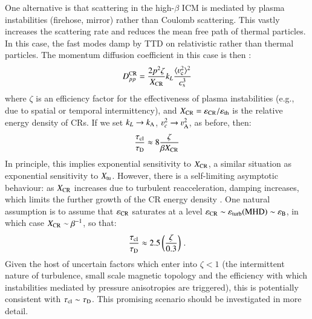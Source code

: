 \documentclass[fleqn,usenatbib,useAMS]{mnras}
\newcommand{\eps}{\varepsilon}
\begin{document}
One alternative is that scattering in the high-$\beta$ ICM is mediated by plasma instabilities (firehose, mirror) rather than Coulomb scattering. This vastly increases the scattering rate and reduces the mean free path of thermal particles. In this case, the fast modes damp by TTD on relativistic rather than thermal particles. The momentum diffusion coefficient in this case is then \citep{brunetti11, miniati15}:
\begin{equation}
D_{pp}^{\rm CR} = \frac{2 p^{2} \zeta}{X_{\rm CR}} k_L \frac{\langle \varv_{\rm c}^{2} \rangle^{2}}{c_{\rm s}^{3}}
\end{equation}
where $\zeta$ is an efficiency factor for the effectiveness of plasma instabilities (e.g., due to spatial or temporal intermittency), and $X_{\rm CR}=\eps_{\rm CR}/\eps_{\rm th}$ is the relative energy density of CRs. If we set $k_L \rightarrow k_{\rm A}$, $\varv_{c}^{2} \rightarrow \varv_{\rm A}^{2}$, as before, then: 
\begin{equation}
\frac{\tau_{\rm cl}}{\tau_{\rm D}} \approx 8 \frac{\zeta}{\beta X_{\rm CR}}
\end{equation}
In principle, this implies exponential sensitivity to $X_{\rm CR}$, a similar situation as exponential sensitivity to $X_{\rm tu}$. However, there is a self-limiting asymptotic behaviour: as $X_{\rm CR}$ increases due to turbulent reacceleration, damping increases, which limits the further growth of the CR energy density \citep{brunetti11}. One natural assumption is to assume that $\eps_{\rm CR}$ saturates at a level $\eps_{\rm CR} \sim \eps_{\rm turb} ({\rm MHD}) \sim \eps_{\rm B}$, in which case $X_{\rm CR} \sim \beta^{-1}$, so that: 
\begin{equation}
\frac{\tau_{\rm cl}}{\tau_{\rm D}} \approx 2.5 \left(\frac{\zeta}{0.3}\right)\,.
\label{eqn:ratios_CR_damp} 
\end{equation}
Given the host of uncertain factors which enter into $\zeta < 1$ (the intermittent nature of turbulence, small scale magnetic topology and the efficiency with which instabilities mediated by pressure anisotropies are triggered), this is potentially consistent with $\tau_{\rm cl} \sim \tau_{\rm D}$. This promising scenario should be investigated in more detail. 
\end{document}
